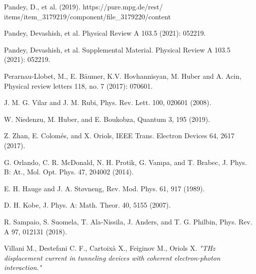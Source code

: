 \documentclass[11pt, a4paper]{article} %
\begin{document}
\begin{thebibliography}{1}
{
Pandey, D., et al. (2019). https://pure.mpg.de/rest/\\ items/item\_3179219/component/file\_3179220/content

Pandey, Devashish, et al. Physical Review A 103.5 (2021): 052219.

Pandey, Devashish, et al. Supplemental Material. Physical Review A 103.5 (2021): 052219.

Perarnau-Llobet, M., E. Bäumer, K.V. Hovhannisyan, M. Huber and A. Acin, Physical review letters 118, no. 7 (2017): 070601.

J. M. G. Vilar and J. M. Rubi, Phys. Rev. Lett. 100, 020601 (2008).

W. Niedenzu, M. Huber, and E. Boukobza, Quantum 3, 195 (2019).

Z. Zhan, E. Colomés, and X. Oriols, IEEE Trans. Electron Devices 64, 2617 (2017).

G. Orlando, C. R. McDonald, N. H. Protik, G. Vampa, and T. Brabec, J. Phys. B: At., Mol. Opt. Phys. 47, 204002 (2014).

E. H. Hauge and J. A. Støvneng, Rev. Mod. Phys. 61, 917 (1989).

D. H. Kobe, J. Phys. A: Math. Theor. 40, 5155 (2007).

R. Sampaio, S. Suomela, T. Ala-Nissila, J. Anders, and T. G. Philbin, Phys. Rev. A 97, 012131 (2018).

Villani M., Destefani C. F., Cartoixà X., Feiginov M., Oriols X. {\em "THz displacement current in tunneling devices with coherent electron-photon
interaction."}

}
\end{thebibliography}
\end{document}
